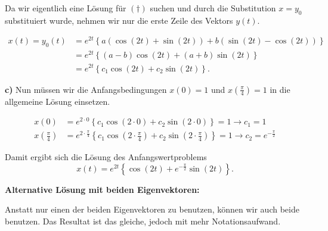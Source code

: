\begin{solution}
    \vspace{0.5\baselineskip}

    Da wir eigentlich eine Lösung für \( (\dagger) \) suchen und durch die Substitution \( x = y_0 \) substituiert wurde, nehmen wir nur die erste Zeile des Vektors \( y(t) \). 

    \begin{equation*}
        \begin{aligned}
        x(t) = y_0(t) &= e^{2t} \left\{ a ( \cos(2t) + \sin(2t) ) + b ( \sin(2t) - \cos(2t) ) \right\} \\[0.5em]
        &= e^{2t} \left\{ (a-b) \cos(2t) + (a+b) \sin(2t) \right\} \\[0.5em]
        &= e^{2t} \left\{ c_1 \cos(2t) + c_2 \sin(2t) \right\}.
        \end{aligned}
    \end{equation*}

    \textbf{c)} Nun müssen wir die Anfangsbedingungen \( x(0) = 1 \) und \( x(\frac{\pi}{4})=1 \) in die allgemeine Lösung einsetzen.

    \begin{equation*}
        \begin{aligned}
            x(0) &= e^{2\cdot 0} \left\{ c_1 \cos(2\cdot 0) + c_2 \sin(2\cdot 0) \right\} = 1 \rightarrow c_1 = 1 \\[0.5em]
            x\left( \frac{\pi}{4} \right) &= e^{2\cdot \frac{\pi}{4}} \left\{ c_1 \cos\left( 2\cdot \frac{\pi}{4} \right) + c_2 \sin\left( 2\cdot \frac{\pi}{4} \right) \right\} = 1 \rightarrow c_2 = e^{-\frac{\pi}{2}}
        \end{aligned}
    \end{equation*}

    Damit ergibt sich die Lösung des Anfangswertproblems
    \begin{equation*}
        x(t) = e^{2t} \left\{ \cos(2t) + e^{-\frac{\pi}{2}} \sin(2t) \right\}.
    \end{equation*}

    \vspace{1\baselineskip}

    \textbf{Alternative Lösung mit beiden Eigenvektoren:}

    Anstatt nur einen der beiden Eigenvektoren zu benutzen, können wir auch beide benutzen. Das Resultat ist das gleiche, jedoch mit mehr Notationsaufwand.


\end{solution}
